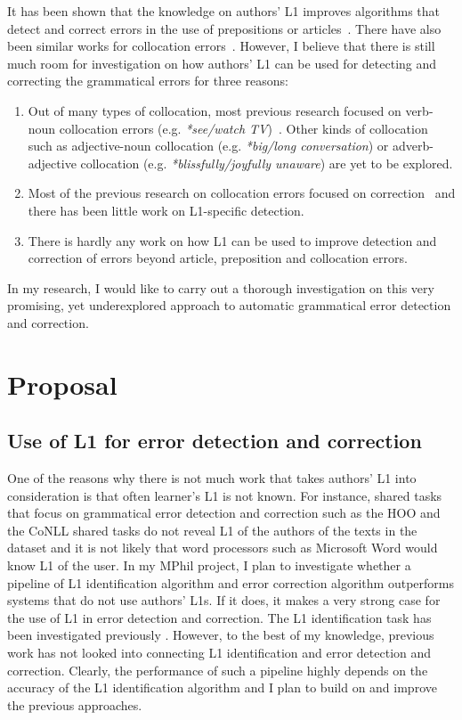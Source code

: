 \documentclass[11pt]{article}
\begin{document}
It has been shown that the knowledge on authors' L1 improves algorithms that 
detect and correct errors in the use of prepositions or 
articles~\citep{rozovskaya2010generating, rozovskaya2011algorithm}. There have 
also been similar works for collocation errors~\citep{chang2008automatic, 
dahlmeier2011correcting, shei2000esl, liu2009automated}. However, I believe that 
there is still much room for investigation on how authors' L1 can be used for 
detecting and correcting the grammatical errors for three reasons:
\begin{enumerate}
\item Out of many 
types of collocation, most previous research focused on 
verb-noun collocation errors (e.g. \emph{*see/watch TV})~\citep{chang2008automatic, shei2000esl, 
liu2009automated}. Other kinds of collocation such as adjective-noun collocation (e.g. \emph{*big/long conversation}) or adverb-adjective collocation (e.g. \emph{*blissfully/joyfully unaware}) are yet to be explored.
\item Most of the previous research on collocation errors focused on correction~\citep{dahlmeier2011correcting, chang2008automatic} and there has been 
little work on L1-specific detection.
\item There is hardly any work on how L1 can be used to improve detection and correction of errors beyond article, preposition and collocation errors.
\end{enumerate}
In my research, I would like to carry out a thorough investigation on this very 
promising, yet underexplored approach to automatic grammatical error detection 
and correction.
\section{Proposal}
\subsection{Use of L1 for error detection and correction}
\label{sub:experiment}
One of the reasons why there is not much work that takes authors' L1 into 
consideration is that often learner's L1 is not known. For instance, 
shared tasks that focus on grammatical error detection and correction such as 
the HOO and the CoNLL shared tasks do not reveal L1 of the authors 
of the texts in the dataset and it is not likely that word processors such as 
Microsoft Word would know L1 of the user. In my MPhil project, I plan to 
investigate whether a pipeline of L1 identification algorithm and error 
correction algorithm outperforms systems that do not use authors' L1s. If it 
does, it makes a very strong case for the use of L1 in error detection and 
correction. The L1 identification task has been investigated previously \citep{estival2007author, tomokiyo2001you, koppel2005determining, 
koppel2005automatically, wong2009contrastive, kochmar2011identification}. 
However, to the best of my knowledge, previous work has not looked into connecting L1 identification and error detection and correction. Clearly, the performance of such 
a pipeline highly depends on the accuracy of the L1 identification algorithm and 
I plan to build on and improve the previous approaches.
\end{document}
